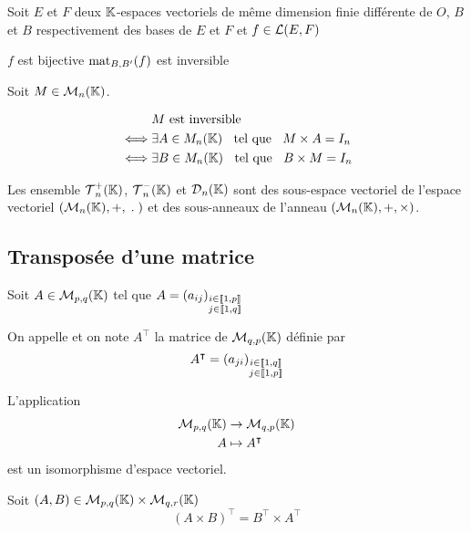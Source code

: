 \begin{prp}
Soit $E$ et $F$ deux $\K$-espaces vectoriels de même dimension finie
différente de $O$, $B$ et $B$ respectivement des bases de $E$ et $F$ et
$f \in \Lin(E, F)$

$f$ est bijective \ssi $\mat_{B, B'}(f)$ est inversible
\end{prp}

\begin{prp}
Soit $M \in \M_n(\K)$.

\begin{align*}
        &M \text{ est inversible} \\
\iff    &\exists A \in M_n(\K) \tq M \times A = I_n \\
\iff    &\exists B \in M_n(\K) \tq B \times M = I_n
\end{align*}
\end{prp}

\begin{prp}
Les ensemble $\Tri_n^+(\K)$, $\Tri_n^-(\K)$ et $\Dia_n(\K)$ sont des
sous-espace vectoriel de l'espace vectoriel $(\M_n(\K), +, \; \point \;)$
et des sous-anneaux de l'anneau $(\M_n(\K), +, \times)$.
\end{prp}


\subsection{Transposée d'une matrice}

\begin{dfn}
Soit $A \in \M_{p, q}(\K)$ tel que $A = (a_{ij})_{\mind{i}{j}{p}{q}}$

On appelle  et on note $A^\intercal$ la matrice
de $\M_{q, p}(\K)$ définie par
\[
    A^\intercal = (a_{ji})_{\mind{i}{j}{q}{p}}
\]
\end{dfn}

\begin{prp}
L'application
\begin{align*}
    \M_{p, q}(\K) &\to \M_{q, p}(\K) \\
    A &\mapsto A^\intercal
\end{align*}
est un isomorphisme d'espace vectoriel.
\end{prp}

\begin{prp}
Soit $(A, B) \in \M_{p, q}(\K) \times \M_{q, r}(\K)$
\[
    (A \times B)^\intercal = B^\intercal \times A^\intercal
\]
\end{prp}

